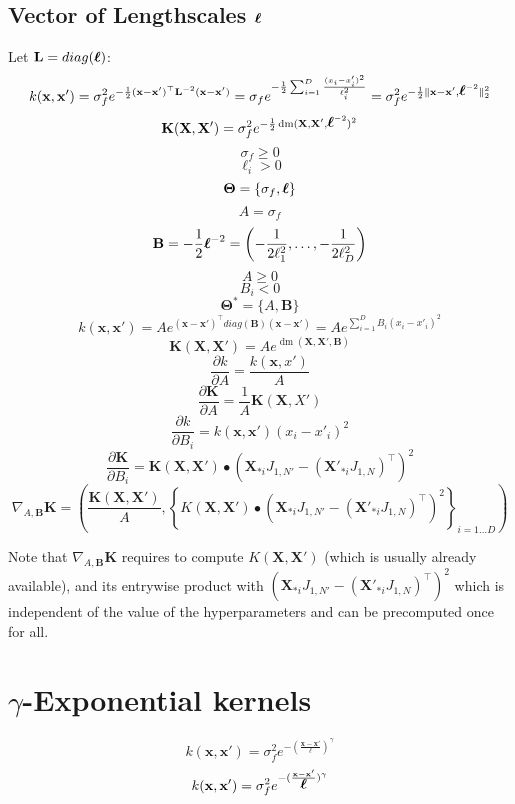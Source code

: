\documentclass[a4paper,11pt]{article}
\newcommand\x{{\mathbf x}}
\newcommand\X{{\mathbf X}}
\newcommand\K{{\mathbf K}}
\newcommand\LL{{\mathbf L}}
\newcommand\ELL{{\Ivec \ell}}
\DeclareMathOperator*{\dm}{dm}
\newcommand{\Ivec}[1]{\mbox{\boldmath $#1$}}
\begin{document}
\subsection{Vector of Lengthscales $\ELL$}
Let $\mathbf{L} = diag(\ELL)$:
$$k(\x,\x') = \sigma_f^2 e^{-\frac{1}{2}(\x-\x')^{\top} \LL^{-2}
  (\x-\x')} = \sigma_f e^{-\frac{1}{2}\sum_{i=1}^D \frac{(x_i -
    x'_i)^2}{\ell_i^2}} = \sigma_f^2
e^{-\frac{1}{2}\|\x-\x',\ELL^{-2}\|_2^2}$$
$$\K(\X,\X') = \sigma_f^2 e^{-\frac{1}{2} \dm(\X,\X',\ELL^{-2})^2}$$
$$\sigma_f \ge 0$$
$$\ell_i > 0$$
$$\mathbf{\Theta} = \{ \sigma_f, \ELL\}$$
$$A = \sigma_f$$
$$\mathbf{B} = -\frac{1}{2}\ELL^{-2} =
\left(-\frac{1}{2\ell_1^2},\ldots,-\frac{1}{2\ell_D^2} \right)$$
$$A \ge 0$$
$$B_i < 0$$
$$\mathbf{\Theta}^* = \{ A, \mathbf{B}\}$$
$$k(\x,\x') = A e^{(\x-\x')^{\top} diag(\mathbf{B}) (\x-\x')} = A
e^{\sum_{i=1}^D B_i (x_i - x'_i)^2}$$ 
$$\K(\X,\X') = A e^{\dm(\X,\X',\mathbf{B})}$$
$$\frac{\partial k}{\partial A} = \frac{k(\x,x')}{A}$$
$$\frac{\partial \K}{\partial A} = \frac{1}{A}\K(\X,X')$$
$$\frac{\partial k}{\partial B_i} = k(\x,\x') (x_i -x'_i)^2$$
$$\frac{\partial \K}{\partial B_i} = \K(\X,\X') \bullet
(\X_{*i}J_{1,N'}- (\X'_{*i}J_{1,N})^{\top})^2$$
$$\nabla_{A,\mathbf{B}} \K = \left(\frac{\K(\X,\X')}{A}, \left\{ K(\X,\X')
  \bullet (\X_{*i}J_{1,N'}- (\X'_{*i}J_{1,N})^{\top})^2 \right\}_{i=1
  \ldots D} \right)$$

Note that $\nabla_{A,\mathbf{B}} \K$ requires to compute $K(\X,\X')$
(which is usually already available), and its entrywise product with
$(\X_{*i}J_{1,N'}- (\X'_{*i}J_{1,N})^{\top})^2$ which is independent
of the value of the hyperparameters and can be precomputed once for
all.

\section{$\gamma$-Exponential kernels}
$$k(\x,\x') = \sigma_f^2 e^{-(\frac{\x-\x'}{\ell})^\gamma}$$
$$k(\x,\x') = \sigma_f^2 e^{-(\frac{\x-\x'}{\ELL})^\gamma}$$
\end{document}

